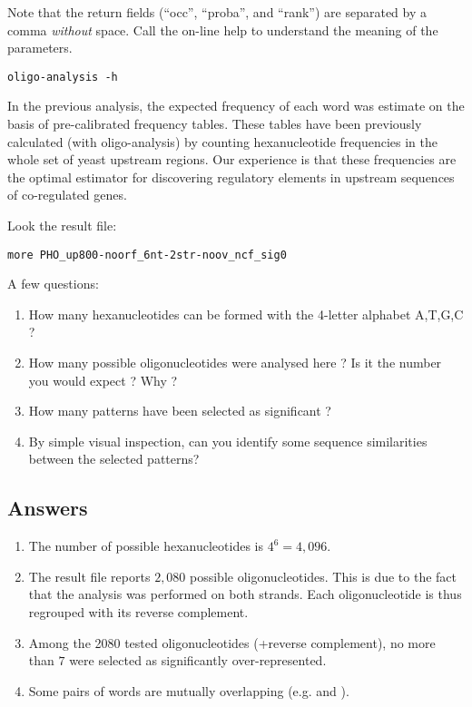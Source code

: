Note that the return fields (``occ'', ``proba'', and ``rank'') are
separated by a comma \textit{without} space. Call the on-line help to
understand the meaning of the parameters.

{\color{Blue} \begin{footnotesize} 
\begin{verbatim} 
oligo-analysis -h
\end{verbatim} \end{footnotesize}
}


In the previous analysis, the expected frequency of each word was
estimate on the basis of pre-calibrated frequency tables.  These
tables have been previously calculated (with oligo-analysis) by
counting hexanucleotide frequencies in the whole set of yeast upstream
regions. Our experience is that these frequencies are the optimal
estimator for discovering regulatory elements in upstream sequences of
co-regulated genes.

Look the result file:

{\color{Blue} \begin{footnotesize} 
\begin{verbatim}
more PHO_up800-noorf_6nt-2str-noov_ncf_sig0
\end{verbatim} \end{footnotesize}
}


A few questions:
\begin{enumerate}
\item How many hexanucleotides can be formed with the 4-letter alphabet A,T,G,C ?
\item How many possible oligonucleotides were analysed here ? Is it the
  number you would expect ? Why ?
\item How many patterns have been selected as significant ?
\item By simple visual inspection, can you identify some sequence
  similarities between the selected patterns?
\end{enumerate}

\subsection{Answers}

\begin{enumerate}
\item The number of possible hexanucleotides is $4^6=4,096$. 
\item The result file reports $2,080$ possible oligonucleotides. This
  is due to the fact that the analysis was performed on both
  strands. Each oligonucleotide is thus regrouped with its reverse
  complement.
\item Among the 2080 tested oligonucleotides (+reverse complement), no
  more than $7$ were selected as significantly over-represented.
\item Some pairs of words are mutually overlapping
  (e.g.  and ).
\end{enumerate}

